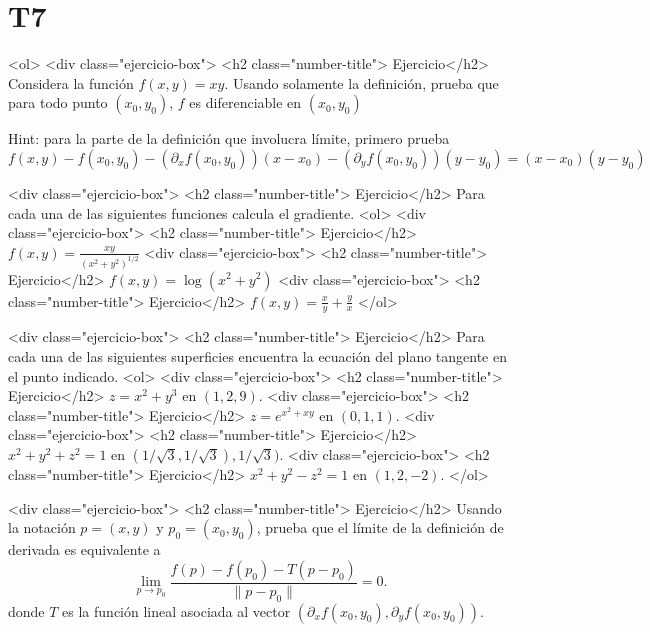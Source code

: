 \documentclass{article}
\theoremstyle{definition}
\begin{document}
\section*{T7}

<ol>
<div class="ejercicio-box"> <h2 class="number-title"> Ejercicio</h2> Considera la función $f(x,y)=xy$. Usando solamente la definición, prueba
  que para todo punto  $(x_0,y_0)$, $f$ es diferenciable en $(x_0,y_0)$



  Hint: para la parte de la definición que involucra  límite,
  primero prueba
        $$
        f(x,y)-f(x_0,y_0)- (\partial_xf(x_0,y_0))(x-x_0)-(\partial_yf(x_0,y_0))
        (y-y_0)= (x-x_0)(y-y_0)
        $$



      <div class="ejercicio-box"> <h2 class="number-title"> Ejercicio</h2> Para cada una de las siguientes funciones calcula el gradiente.
        <ol>
        <div class="ejercicio-box"> <h2 class="number-title"> Ejercicio</h2> $f(x,y)=\frac{xy}{(x^2+y^2)^{1/2}}$
        <div class="ejercicio-box"> <h2 class="number-title"> Ejercicio</h2> $f(x,y)=\log(x^2+y^2)$
          <div class="ejercicio-box"> <h2 class="number-title"> Ejercicio</h2> $f(x,y)=\frac{x}{y}+\frac{y}{x}$
        </ol>


        
      <div class="ejercicio-box"> <h2 class="number-title"> Ejercicio</h2> Para cada una de las siguientes superficies encuentra la
        ecuación del plano tangente en el punto indicado.
        <ol>
        <div class="ejercicio-box"> <h2 class="number-title"> Ejercicio</h2> $z=x^2+y^3$ en $(1,2,9)$.
        <div class="ejercicio-box"> <h2 class="number-title"> Ejercicio</h2> $z=e^{x^2+xy}$ en $(0,1,1)$.
        <div class="ejercicio-box"> <h2 class="number-title"> Ejercicio</h2> $x^2+y^2+z^2=1$ en $(1/\sqrt{3}, 1/\sqrt{3}), 1/\sqrt{3})$.
          <div class="ejercicio-box"> <h2 class="number-title"> Ejercicio</h2> $x^2+y^2-z^2=1$ en $(1,2,-2)$.
        </ol>


                
      <div class="ejercicio-box"> <h2 class="number-title"> Ejercicio</h2> Usando la notación  $p=(x,y)$ y  $p_0=(x_0,y_0)$, prueba que el
        límite de la definición de derivada  es equivalente a
        $$
        \lim_{p\to p_0}\frac{f(p)-f(p_0)-T(p-p_0) }{\|p-p_0\|}=0.
        $$
        donde $T$ es la función lineal asociada al vector
        $(\partial_xf(x_0,y_0), \partial_yf(x_0,y_0))$.
\end{document}
